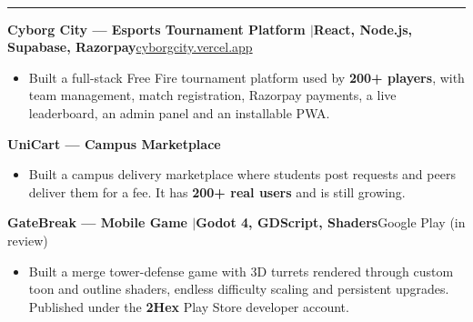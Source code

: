 \documentclass[10pt,a4paper]{article}
\renewcommand{\section}[1]{\vspace{6pt}{\large\bfseries\MakeUppercase{#1}}\\[-7pt]\rule{\textwidth}{0.6pt}\vspace{2pt}}
\newcommand{\entry}[2]{\par\textbf{#1}\hfill #2\par}
\newenvironment{points}{\vspace{-4pt}\begin{itemize}\setlength{\itemsep}{0pt}\setlength{\parskip}{0pt}\setlength{\topsep}{0pt}\setlength{\partopsep}{0pt}\setlength{\leftmargin}{12pt}}{\end{itemize}\vspace{-2pt}}
\newcommand{\sep}{\enspace$|$\enspace}
\begin{document}
\section{Live Products}
\entry{Cyborg City --- Esports Tournament Platform \textnormal{\sep React, Node.js, Supabase, Razorpay}}{\href{https://cyborgcity.vercel.app}{cyborgcity.vercel.app}}
\begin{points}
  \item Built a full-stack Free Fire tournament platform used by \textbf{200+ players}, with team management, match registration, Razorpay payments, a live leaderboard, an admin panel and an installable PWA.
\end{points}
\entry{UniCart --- Campus Marketplace}{}
\begin{points}
  \item Built a campus delivery marketplace where students post requests and peers deliver them for a fee. It has \textbf{200+ real users} and is still growing.
\end{points}
\entry{GateBreak --- Mobile Game \textnormal{\sep Godot 4, GDScript, Shaders}}{Google Play (in review)}
\begin{points}
  \item Built a merge tower-defense game with 3D turrets rendered through custom toon and outline shaders, endless difficulty scaling and persistent upgrades. Published under the \textbf{2Hex} Play Store developer account.
\end{points}
\end{document}
